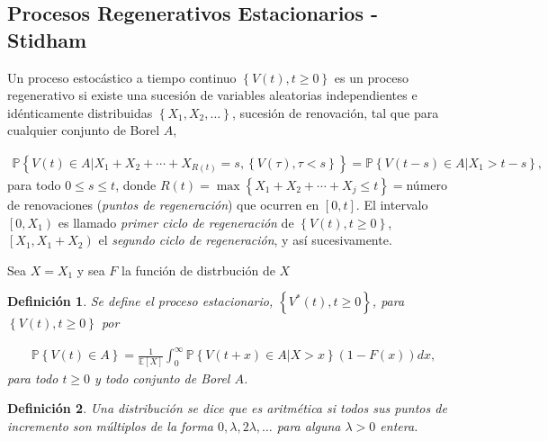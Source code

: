 \documentclass{article}
\newtheorem{Def}{Definición}
\newcommand{\esp}{\mathbb{E}}
\newcommand{\prob}{\mathbb{P}}
\begin{document}
\subsection{Procesos Regenerativos Estacionarios - Stidham \cite{Stidham}}


Un proceso estoc\'astico a tiempo continuo $\left\{V\left(t\right),t\geq0\right\}$ es un proceso regenerativo si existe una sucesi\'on de variables aleatorias independientes e id\'enticamente distribuidas $\left\{X_{1},X_{2},\ldots\right\}$, sucesi\'on de renovaci\'on, tal que para cualquier conjunto de Borel $A$, 

\begin{eqnarray*}
\prob\left\{V\left(t\right)\in A|X_{1}+X_{2}+\cdots+X_{R\left(t\right)}=s,\left\{V\left(\tau\right),\tau<s\right\}\right\}=\prob\left\{V\left(t-s\right)\in A|X_{1}>t-s\right\},
\end{eqnarray*}
para todo $0\leq s\leq t$, donde $R\left(t\right)=\max\left\{X_{1}+X_{2}+\cdots+X_{j}\leq t\right\}=$n\'umero de renovaciones ({\emph{puntos de regeneraci\'on}}) que ocurren en $\left[0,t\right]$. El intervalo $\left[0,X_{1}\right)$ es llamado {\emph{primer ciclo de regeneraci\'on}} de $\left\{V\left(t \right),t\geq0\right\}$, $\left[X_{1},X_{1}+X_{2}\right)$ el {\emph{segundo ciclo de regeneraci\'on}}, y as\'i sucesivamente.

Sea $X=X_{1}$ y sea $F$ la funci\'on de distrbuci\'on de $X$


\begin{Def}
Se define el proceso estacionario, $\left\{V^{*}\left(t\right),t\geq0\right\}$, para $\left\{V\left(t\right),t\geq0\right\}$ por

\begin{eqnarray*}
\prob\left\{V\left(t\right)\in A\right\}=\frac{1}{\esp\left[X\right]}\int_{0}^{\infty}\prob\left\{V\left(t+x\right)\in A|X>x\right\}\left(1-F\left(x\right)\right)dx,
\end{eqnarray*} 
para todo $t\geq0$ y todo conjunto de Borel $A$.
\end{Def}

\begin{Def}
Una distribuci\'on se dice que es {\emph{aritm\'etica}} si todos sus puntos de incremento son m\'ultiplos de la forma $0,\lambda, 2\lambda,\ldots$ para alguna $\lambda>0$ entera.
\end{Def}
\end{document}
